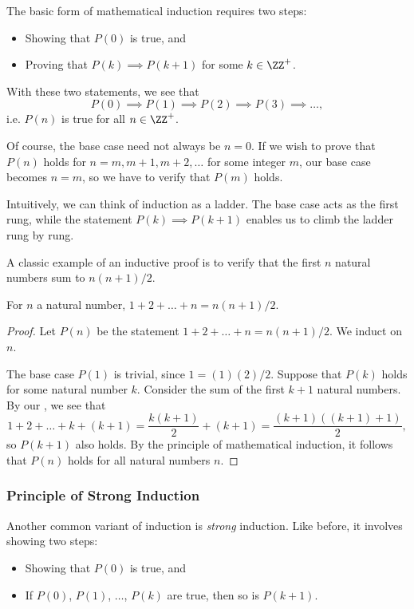 The basic form of mathematical induction requires two steps:

\begin{itemize}
    \item Showing that $P(0)$ is true, and
    \item Proving that $P(k) \implies P(k+1)$ for some $k \in \ZZ^+$.
\end{itemize}

With these two statements, we see that \[P(0) \implies P(1) \implies P(2) \implies P(3) \implies \dots,\] i.e. $P(n)$ is true for all $n \in \ZZ^+$.

Of course, the base case need not always be $n = 0$. If we wish to prove that $P(n)$ holds for $n = m, m+1, m+2, \dots$ for some integer $m$, our base case becomes $n = m$, so we have to verify that $P(m)$ holds.

Intuitively, we can think of induction as a ladder. The base case acts as the first rung, while the statement $P(k) \implies P(k+1)$ enables us to climb the ladder rung by rung.

A classic example of an inductive proof is to verify that the first $n$ natural numbers sum to $n(n+1)/2$.

\begin{statement}
    For $n$ a natural number, $1 + 2 + \dots + n = n(n+1)/2$.
\end{statement}
\begin{proof}
    Let $P(n)$ be the statement $1 + 2 + \dots + n = n(n+1)/2$. We induct on $n$.

    The base case $P(1)$ is trivial, since $1 = (1)(2)/2$. Suppose that $P(k)$ holds for some natural number $k$. Consider the sum of the first $k+1$ natural numbers. By our , we see that \[1 + 2 + \dots + k + (k+1) = \frac{k(k+1)}{2} + (k + 1) = \frac{(k+1)((k+1) + 1)}{2},\] so $P(k+1)$ also holds. By the principle of mathematical induction, it follows that $P(n)$ holds for all natural numbers $n$.
\end{proof}

\subsubsection{Principle of Strong Induction}

Another common variant of induction is \emph{strong} induction. Like before, it involves showing two steps:

\begin{itemize}
    \item Showing that $P(0)$ is true, and
    \item If $P(0)$, $P(1)$, $\dots$, $P(k)$ are true, then so is $P(k+1)$.
\end{itemize}

